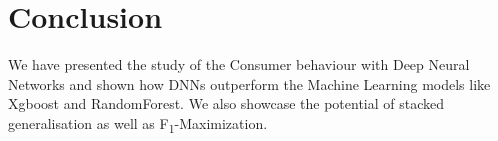 \section{Conclusion}
\label{sec:conclusion}
We have presented the study of the Consumer behaviour with Deep Neural Networks and shown how
DNNs outperform the Machine Learning models like Xgboost and RandomForest. We also showcase the 
potential of stacked generalisation as well as F\textsubscript{1}-Maximization.